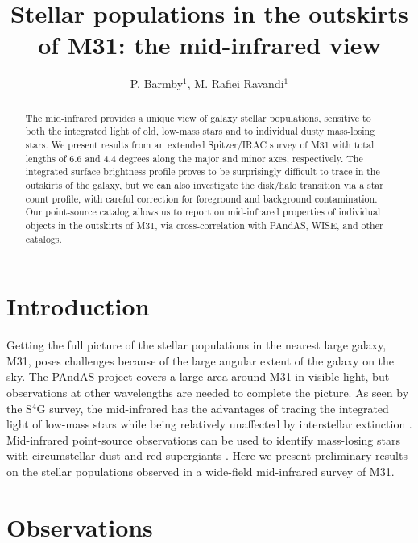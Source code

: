 \documentclass{iau}
\title[S321.~~Mid-infrared outskirts of M31] %
{Stellar populations in the outskirts of M31: the mid-infrared view}
\author[P. Barmby \& M. Rafiei Ravandi]   %
{P. Barmby$^1$, M. Rafiei Ravandi$^1$}
\affiliation{$^1$Department of Physics and Astronomy and Centre for Planetary and Space Exploration,
University of Western Ontario, London, Canada \\ email: {\tt pbarmby@uwo.ca}}
\begin{document}
\maketitle

\begin{abstract}
The mid-infrared provides a unique view of galaxy stellar populations, sensitive to both the integrated light of old, 
low-mass stars and to individual dusty mass-losing stars. We present results from an extended Spitzer/IRAC survey 
of M31 with total lengths of 6.6 and 4.4 degrees along the major and minor axes, respectively. The integrated surface 
brightness profile proves to be surprisingly difficult to trace in the outskirts of the galaxy, but we can also investigate 
the disk/halo transition via a star count profile, with careful correction for foreground and background contamination. 
Our point-source catalog allows us to report on mid-infrared properties of individual objects in the outskirts of M31, 
via cross-correlation with PAndAS, WISE, and other catalogs.

\end{abstract}

\firstsection %
\section{Introduction}

Getting the full picture of the stellar populations in the nearest large galaxy, M31, poses challenges because of the
large angular extent of the galaxy on the sky. The PAndAS project \cite[(McConnachie \etal\ 2009)]{pandas} covers
a large area around M31 in visible light, but observations at other wavelengths are needed to complete the picture.
As seen by the S$^4$G survey, the mid-infrared has the advantages of tracing the integrated light of low-mass stars while being relatively unaffected 
by interstellar extinction \cite[(Querejeta \etal\ 2015)]{q15}. Mid-infrared point-source observations can 
be used to identify  mass-losing stars with circumstellar dust \cite[(Boyer \etal\ 2015)]{boyer15} and red
supergiants \cite[(Britavskiy \etal\ 2015)]{brit15}. Here we present preliminary results on the stellar populations
observed in a wide-field mid-infrared survey of M31.

\section{Observations}
\end{document}
